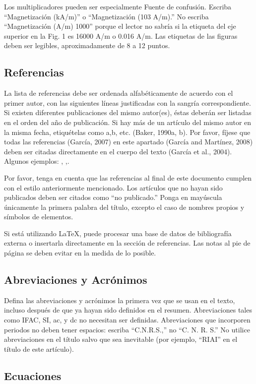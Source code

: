 \documentclass[final,5p,times,twocolumn,authoryear,10pt]{elsarticle}
\begin{document}
Los multiplicadores pueden ser especialmente Fuente de confusión. Escriba “Magnetización (kA/m)” o “Magnetización (103 A/m).” No escriba “Magnetización (A/m)  1000” porque el lector no sabría si la etiqueta del eje superior en la Fig. 1 es 16000 A/m o 0.016 A/m. Las etiquetas de las figuras deben ser legibles, aproximadamente de 8 a 12 puntos.

\subsection{Referencias}
La lista de referencias debe ser ordenada alfabéticamente de acuerdo con el primer autor, con las siguientes líneas justificadas con la sangría correspondiente. Si existen diferentes publicaciones del mismo autor(es), éstas deberán ser listadas en el orden del año de publicación. Si hay más de un artículo del mismo autor en la misma fecha, etiquételas como a,b, etc. (Baker, 1990a, b). Por favor, fíjese que todas las referencias (García, 2007) en este apartado (García and Martínez, 2008) deben ser citadas directamente en el cuerpo del texto (García et al., 2004). Algunos ejemplos: \cite{Bak:63a,Bak:63b}, \cite{Keohane:58},\cite{ChaRou:66}.

Por favor, tenga en cuenta que las referencias al final de este documento cumplen con el estilo anteriormente mencionado. Los artículos que no hayan sido publicados deben ser citados como “no publicado.” Ponga en mayúscula únicamente la primera palabra del título, excepto el caso de nombres propios y símbolos de elementos.

Si está utilizando LaTeX, puede procesar una base de datos de bibliografía externa o insertarla directamente en la sección de referencias. Las notas al pie de página se deben evitar en la medida de lo posible.

\subsection{Abreviaciones y Acrónimos}
Defina las abreviaciones y acrónimos la primera vez que se usan en el texto, incluso después de que ya hayan sido definidos en el resumen. Abreviaciones tales como IFAC, SI, ac, y dc no necesitan ser definidas. Abreviaciones que incorporen periodos no deben tener espacios: escriba “C.N.R.S.,” no “C. N. R. S.” No utilice abreviaciones en el título salvo que sea inevitable (por ejemplo, “RIAI” en el título de este artículo).


\subsection{Ecuaciones}
\end{document}
